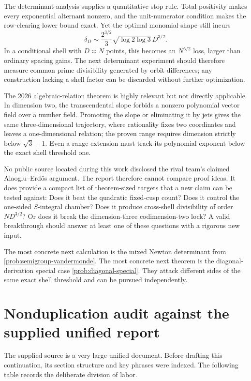 \documentclass[10pt,oneside]{article}
\theoremstyle{definition}
\theoremstyle{remark}
\begin{document}
The determinant analysis supplies a quantitative stop rule.  Total positivity makes every exponential alternant nonzero, and the unit-numerator condition makes the row-clearing lower bound exact.  Yet the optimal monomial shape still incurs
\[
 \delta_D\sim
 \frac{2^{3/2}}3\sqrt{\log2\log3}\,D^{3/2}.
\]
In a conditional shell with \(D\asymp N\) points, this becomes an \(N^{5/2}\) loss, larger than ordinary spacing gains.  The next determinant experiment should therefore measure common prime divisibility generated by orbit differences; any construction lacking a shell factor can be discarded without further optimization.

The 2026 algebraic-relation theorem is highly relevant but not directly applicable.  In dimension two, the transcendental slope forbids a nonzero polynomial vector field over a number field.  Promoting the slope or eliminating it by jets gives the same three-dimensional trajectory, where rationality fixes two coordinates and leaves a one-dimensional relation; the proven range requires dimension strictly below \(\sqrt3-1\).  Even a range extension must track its polynomial exponent below the exact shell threshold one.

No public source located during this work disclosed the rival team's claimed Alaoglu--Erd\H{o}s argument.  The report therefore cannot compare proof ideas.  It does provide a compact list of theorem-sized targets that a new claim can be tested against: Does it beat the quadratic fixed-cusp count?  Does it control the one-sided \(S\)-integral chamber?  Does it produce cross-shell divisibility of order \(ND^{3/2}\)?  Or does it break the dimension-three codimension-two lock?  A valid breakthrough should answer at least one of these questions with a rigorous new input.

\begin{targetbox}
The most concrete next calculation is the mixed Newton determinant from \cref{prob:semigroup-vandermonde}.  The most concrete next theorem is the diagonal-derivation special case \cref{prob:diagonal-special}.  They attack different sides of the same exact shell threshold and can be pursued independently.
\end{targetbox}

\appendix

\section{Nonduplication audit against the supplied unified report}
\label{app:nonduplication}
The supplied source is a very large unified document.  Before drafting this continuation, its section structure and key phrases were indexed.  The following table records the deliberate division of labor.
\end{document}
